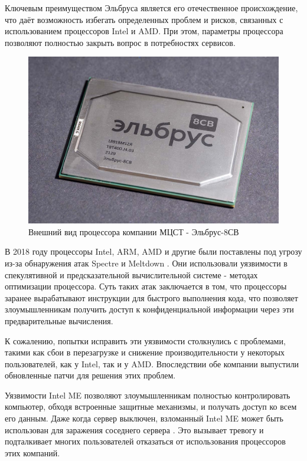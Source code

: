 
Ключевым преимуществом Эльбруса является его отечественное происхождение, что даёт возможность избегать определенных проблем и рисков, связанных с использованием процессоров Intel и AMD. При этом, параметры процессора позволяют полностью закрыть вопрос в потребностях сервисов.

\begin{figure}
  \centering
  \includegraphics[width=.6\textwidth]{graphics/img/elbrus}
  \caption{Внешний вид процессора компании МЦСТ - Эльбрус-8СВ}
  \label{fig:elbrus}
\end{figure}

В 2018 году процессоры Intel, ARM, AMD и другие были поставлены под угрозу из-за обнаружения атак Spectre и Meltdown \cite{risk:spectual_hack}. Они использовали уязвимости в спекулятивной и предсказательной вычислительной системе - методах оптимизации процессора. Суть таких атак заключается в том, что процессоры заранее вырабатывают инструкции для быстрого выполнения кода, что позволяет злоумышленникам получить доступ к конфиденциальной информации через эти предварительные вычисления.

К сожалению, попытки исправить эти уязвимости столкнулись с проблемами, такими как сбои в перезагрузке и снижение производительности у некоторых пользователей, как у Intel, так и у AMD. Впоследствии обе компании выпустили обновленные патчи для решения этих проблем.

Уязвимости Intel ME позволяют злоумышленникам полностью контролировать компьютер, обходя встроенные защитные механизмы, и получать доступ ко всем его данным. Даже когда сервер выключен, взломанный Intel ME может быть использован для заражения соседнего сервера \cite{risk:intelme}. Это вызывает тревогу и подталкивает многих пользователей отказаться от использования процессоров этих компаний.

